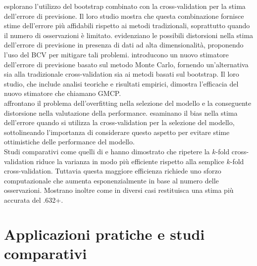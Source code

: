 \textcite{Fuetal} esplorano l'utilizzo del bootstrap combinato con la cross-validation per la stima dell'errore di previsione. Il loro studio mostra che questa combinazione fornisce stime dell'errore più affidabili rispetto ai metodi tradizionali, soprattutto quando il numero di osservazioni è limitato. \textcite{vansanden} evidenziano le possibili distorsioni nella stima dell'errore di previsione in presenza di dati ad alta dimensionalità, proponendo l'uso del BCV per mitigare tali problemi. \textcite{hefny} introducono un nuovo stimatore dell'errore di previsione basato sul metodo Monte Carlo, fornendo un'alternativa sia alla tradizionale cross-validation sia ai metodi basati sul bootstrap. Il loro studio, che include analisi teoriche e risultati empirici, dimostra l'efficacia del nuovo stimatore che chiamano GMCP.\\
\textcite{cawley} affrontano il problema dell'overfitting nella selezione del modello e la conseguente distorsione nella valutazione della performance. \textcite{varma} esaminano il bias nella stima dell'errore quando si utilizza la cross-validation per la selezione del modello, sottolineando l'importanza di considerare questo aspetto per evitare stime ottimistiche delle performance del modello.\\
Studi comparativi come quelli di \textcite{wongTT} e \textcite{kim2009} hanno dimostrato che ripetere la  $k$-fold cross-validation riduce la varianza in modo più efficiente rispetto alla semplice $k$-fold cross-validation. Tuttavia questa maggiore efficienza richiede uno sforzo computazionale che aumenta esponenzialmente in base al numero delle osservazioni. Mostrano inoltre come in diversi casi restituisca una stima più accurata del .632+.


\section{Applicazioni pratiche e studi comparativi}
\label{sec:sezione7.5}



